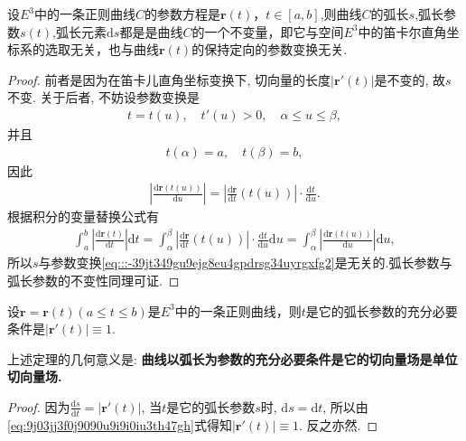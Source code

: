 \documentclass[../../main.tex]{subfiles}%
\begin{document}
\begin{theorem}
设$E^3$中的一条正则曲线$C$的参数方程是$\bm{r}(t)$，$t\in[a,b]$,则曲线$C$的弧长$s$,弧长参数$s(t)$,弧长元素$\mathrm{d}s$都是是曲线$C$的一个不变量，即它与空间$E^3$中的笛卡尔直角坐标系的选取无关，也与曲线$\bm{r}(t)$的保持定向的参数变换无关.
\end{theorem}
\begin{proof}

前者是因为在笛卡儿直角坐标变换下, 切向量的长度$|\bm{r}'(t)|$是不变的, 故$s$不变. 关于后者, 不妨设参数变换是
\begin{align}
t = t(u),\quad t'(u) > 0,\quad \alpha \leqslant u \leqslant \beta,
\label{eq:::-39jt349gu9ejg8eu4gpdrsg34uyrgxfg2}
\end{align}
并且
\begin{align*}
t(\alpha) = a,\quad t(\beta) = b,
\end{align*}
因此
\begin{align}
\left| \frac{\mathrm{d}\bm{r}(t(u))}{\mathrm{d}u} \right| = \left| \frac{\mathrm{d}\bm{r}}{\mathrm{d}t}(t(u)) \right| \cdot \frac{\mathrm{d}t}{\mathrm{d}u}.
\label{eq:::-39jt349gu9ejg8eu4gpdrsg34uyrgxfg3}
\end{align}
根据积分的变量替换公式有
\begin{align*}
\int_a^b \left| \frac{\mathrm{d}\bm{r}(t)}{\mathrm{d}t} \right| \mathrm{d}t = \int_\alpha^\beta \left| \frac{\mathrm{d}\bm{r}}{\mathrm{d}t}(t(u)) \right| \cdot \frac{\mathrm{d}t}{\mathrm{d}u} \mathrm{d}u 
= \int_\alpha^\beta \left| \frac{\mathrm{d}\bm{r}(t(u))}{\mathrm{d}u} \right| \mathrm{d}u,
\end{align*}
所以$s$与参数变换\eqref{eq:::-39jt349gu9ejg8eu4gpdrsg34uyrgxfg2}是无关的.弧长参数与弧长参数的不变性同理可证.

\end{proof}

\begin{theorem}\label{theorem:微分几何-定理2.1}
设$\bm{r} = \bm{r}(t)(a \leqslant t \leqslant b)$是$E^3$中的一条正则曲线，则$t$是它的弧长参数的充分必要条件是$|\bm{r}'(t)| \equiv 1$.
\end{theorem}
\begin{remark}
上述定理的几何意义是: \textbf{曲线以弧长为参数的充分必要条件是它的切向量场是单位切向量场.}
\end{remark}
\begin{proof}

因为$\frac{\mathrm{d}s}{\mathrm{d}t} = |\bm{r}'(t)|$, 当$t$是它的弧长参数$s$时, $\mathrm{d}s = \mathrm{d}t$, 所以由\eqref{eq:9j03jj3f0j9090u9i9i0iu3th47gh}式得知$|\bm{r}'(t)| \equiv 1$. 反之亦然.

\end{proof}
\end{document}
